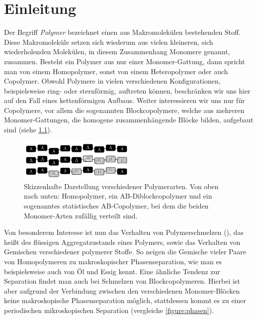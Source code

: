 \documentclass[../main.tex]{subfiles}
\begin{document}
\chapter{Einleitung} %
\label{chapter:einleitung}

Der Begriff \emph{Polymer} bezeichnet einen aus Makromolekülen bestehenden Stoff.
Diese Makromoleküle setzen sich wiederum aus vielen kleineren, sich wiederholenden Molekülen, in diesem Zusammenhang Monomere genannt, zusammen.
Besteht ein Polymer aus nur einer Monomer-Gattung, dann spricht man von einem Homopolymer, sonst von einem Heteropolymer oder auch Copolymer.
Obwohl Polymere in vielen verschiedenen Konfigurationen, beispielsweise ring- oder sternförmig, auftreten können, beschränken wir uns hier auf den Fall eines kettenförmigen Aufbaus.
Weiter interessieren wir uns nur für Copolymere, vor allem die sogenannten Blockcopolymere, welche aus mehreren Monomer-Gattungen, die homogene zusammenhängende Blöcke bilden, aufgebaut sind (siehe \cref{figure:polymerketten}).

\begin{figure}
    \centering
    \includegraphics[width=0.5\textwidth]{figures/einleitung/copoly1.pdf}
    \caption[Skizzenhafte Darstellung verschiedener Polymerarten.]{%
        Skizzenhafte Darstellung verschiedener Polymerarten.
        Von oben nach unten: Homopolymer, ein AB-Diblockcopolymer und ein sogenanntes statistisches AB-Copolymer, bei dem die beiden Monomer-Arten zufällig verteilt sind.
    }
    \label{figure:polymerketten}
\end{figure}

Von besonderem Interesse ist nun das Verhalten von Polymerschmelzen (), das heißt des flüssigen Aggregatzustands eines Polymers, sowie das Verhalten von Gemischen verschiedener polymerer Stoffe.
So neigen die Gemische vieler Paare von Homopolymeren zu makroskopischer Phasenseparation, wie man es beispielsweise auch von Öl und Essig kennt.
Eine ähnliche Tendenz zur Separation findet man auch bei Schmelzen von Blockcopolymeren.
Hierbei ist aber aufgrund der Verbindung zwischen den verschiedenen Monomer-Blöcken keine makroskopische Phasenseparation möglich, stattdessen kommt es zu einer periodischen mikroskopischen Separation (vergleiche \cref{figure:phasen}).
\end{document}

